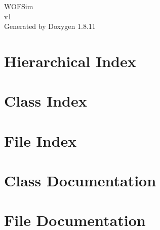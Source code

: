 \documentclass[twoside]{book}
\newcommand{\+}{\discretionary{\mbox{\scriptsize$\hookleftarrow$}}{}{}}
\newcommand{\clearemptydoublepage}{%
  \newpage{\pagestyle{empty}\cleardoublepage}%
}
\begin{document}
\hypersetup{pageanchor=false,
             bookmarksnumbered=true,
             pdfencoding=unicode
            }
\begin{titlepage}
\vspace*{7cm}
\begin{center}%
{\Large W\+O\+F\+Sim \\[1ex]\large v1 }\\
\vspace*{1cm}
{\large Generated by Doxygen 1.8.11}\\
\end{center}
\end{titlepage}
\clearemptydoublepage
\tableofcontents
\clearemptydoublepage
{}
\hypersetup{pageanchor=true}

\chapter{Hierarchical Index}

\chapter{Class Index}

\chapter{File Index}

\chapter{Class Documentation}









\chapter{File Documentation}
















\backmatter
\newpage
{}
\clearemptydoublepage
{}
\printindex
\end{document}

